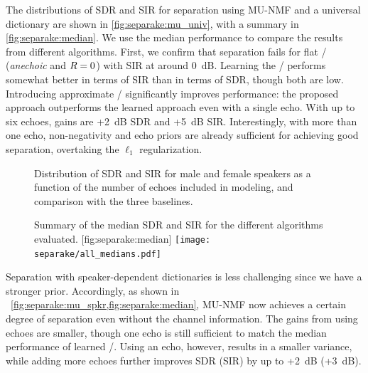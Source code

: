 \mynewline
The distributions of \ac{SDR} and \ac{SIR} for separation using \ac{MU}-\ac{NMF} and a universal dictionary are shown in \cref{fig:separake:mu_univ}, with a summary in \cref{fig:separake:median}.
We use the median performance to compare the results from different algorithms.
First, we confirm that separation fails for flat \RTFs/ (\textit{anechoic} and $R=0$) with \ac{SIR} at around 0~dB.
Learning the \RTFs/ performs somewhat better in terms of \ac{SIR} than in terms of \ac{SDR}, though both are low.
Introducing approximate \RTFs/ significantly improves performance: the proposed approach outperforms the learned approach even with a single echo.
With up to six echoes, gains are +2~dB \ac{SDR} and +5~dB \ac{SIR}.
Interestingly, with more than one echo, non-negativity and echo priors are already sufficient for achieving good separation, overtaking the $\ell_1$ regularization.


\begin{figure}[t]
    \begin{fullwidth}
    \centering
    \hfill
    \hfill
    \caption{Distribution of \ac{SDR} and \ac{SIR} for male and female speakers as a function of the number of echoes included in modeling, and comparison with the three baselines.}
    \label{fig:separake:results}
    \end{fullwidth}
\end{figure}


\begin{figure}[b]
    \begin{sidecaption}[]{
            Summary of the median \ac{SDR} and \ac{SIR} for the different algorithms evaluated.
        }[fig:separake:median]
        \centering
        \small
        \texttt{[image: separake/all\_medians.pdf]}
    \end{sidecaption}
\end{figure}


\mynewline
Separation with speaker-dependent dictionaries is less challenging since we have a stronger prior.
Accordingly, as shown in ~\cref{fig:separake:mu_spkr,fig:separake:median}, \ac{MU}-\ac{NMF} now achieves a certain degree of separation even without the channel information.
The gains from using echoes are smaller, though one echo is still sufficient to match the median performance of learned \RTFs/.
Using an echo, however, results in a smaller variance, while adding more echoes further improves \ac{SDR} (\ac{SIR}) by up to +2~dB (+3~dB).

